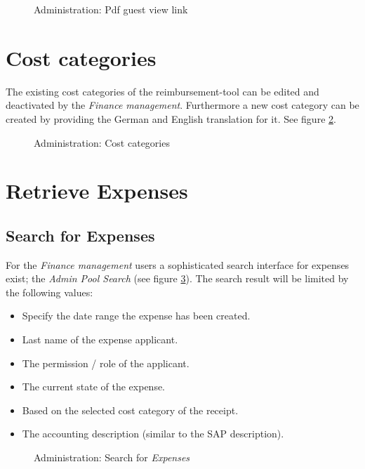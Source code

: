 \begin{figure}[H]
    \centering
    \caption{Administration: Pdf guest view link}
    \label{fig:pdf-web}
\end{figure}

\section*{Cost categories}

The existing cost categories of the reimbursement-tool can be edited and deactivated by the \textit{Finance management}. Furthermore a new cost category can be created by providing the German and English translation for it. See figure \ref{fig:admin-costcategories}.

\begin{figure}[H]
    \centering
    \caption{Administration: Cost categories}
    \label{fig:admin-costcategories}
\end{figure}

\section*{Retrieve Expenses}
\subsection*{Search for Expenses}

For the \textit{Finance management} users a sophisticated search interface for expenses exist; the \textit{Admin Pool Search} (see figure \ref{fig:admin-search}). The search result will be limited by the following values:

\begin{itemize}
    \item Specify the date range the expense has been created.
    \item Last name of the expense applicant.
    \item The permission / role of the applicant.
    \item The current state of the expense.
    \item Based on the selected cost category of the receipt.
    \item The accounting description (similar to the SAP description).
\end{itemize}

\begin{figure}[H]
    \centering
    \caption{Administration: Search for \textit{Expenses}}
    \label{fig:admin-search}
\end{figure}


